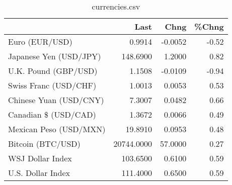\documentclass{article}%
\begin{document}
%


\begin{table}[htbp]%
\caption{currencies.csv}%
\centering%
\begin{adjustbox}{width=1\textwidth}%
\begin{tabular}{lrrr}
\toprule
                       &       Last &    Chng &  \%Chng \\
\midrule
        Euro (EUR/USD) &     0.9914 & -0.0052 &  -0.52 \\
Japanese Yen (USD/JPY) &   148.6900 &  1.2000 &   0.82 \\
  U.K. Pound (GBP/USD) &     1.1508 & -0.0109 &  -0.94 \\
 Swiss Franc (USD/CHF) &     1.0013 &  0.0053 &   0.53 \\
Chinese Yuan (USD/CNY) &     7.3007 &  0.0482 &   0.66 \\
  Canadian \$ (USD/CAD) &     1.3672 &  0.0066 &   0.49 \\
Mexican Peso (USD/MXN) &    19.8910 &  0.0953 &   0.48 \\
     Bitcoin (BTC/USD) & 20744.0000 & 57.0000 &   0.27 \\
      WSJ Dollar Index &   103.6500 &  0.6100 &   0.59 \\
     U.S. Dollar Index &   111.4000 &  0.6500 &   0.59 \\
\bottomrule
\end{tabular}
%
\end{adjustbox}%
\end{table}

%
\end{document}
